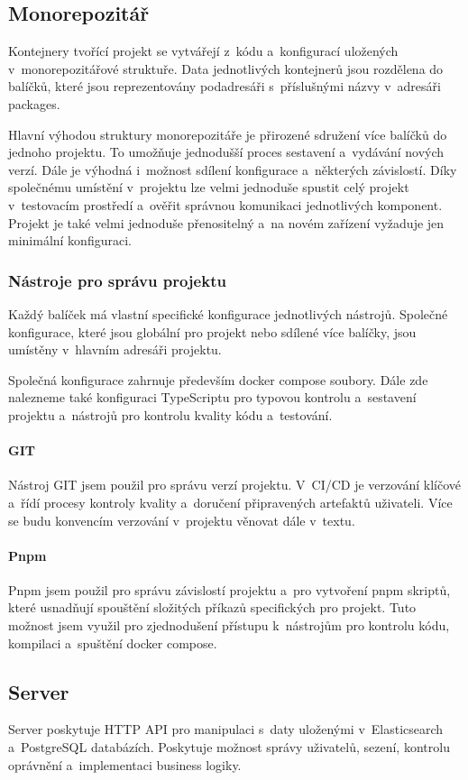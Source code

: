 \documentclass[
  tables=false,
  glossaries,
  index
]{kidiplom}
\begin{document}
\subsection{Monorepozitář}
Kontejnery tvořící projekt se vytvářejí z~kódu a~konfigurací uložených v~monorepozitářové struktuře. Data jednotlivých kontejnerů jsou rozdělena do balíčků, které jsou reprezentovány podadresáři s~příslušnými názvy v~adresáři packages.

Hlavní výhodou struktury monorepozitáře je přirozené sdružení více balíčků do jednoho projektu. To umožňuje jednodušší proces sestavení a~vydávání nových verzí. Dále je výhodná i~možnost sdílení konfigurace a~některých závislostí. Díky společnému umístění v~projektu lze velmi jednoduše spustit celý projekt v~testovacím prostředí a~ověřit správnou komunikaci jednotlivých komponent. Projekt je také velmi jednoduše přenositelný a~na novém zařízení vyžaduje jen minimální konfiguraci.

\subsubsection{Nástroje pro správu projektu}
Každý balíček má vlastní specifické konfigurace jednotlivých nástrojů. Společné konfigurace, které jsou globální pro projekt nebo sdílené více balíčky, jsou umístěny v~hlavním adresáři projektu.

Společná konfigurace zahrnuje především docker compose soubory. Dále zde nalezneme také  konfiguraci TypeScriptu pro typovou kontrolu a~sestavení projektu a~nástrojů pro kontrolu kvality kódu a~testování.

\paragraph{GIT}
Nástroj GIT jsem použil pro správu verzí projektu. V~CI/CD je verzování klíčové a~řídí procesy kontroly kvality a~doručení připravených artefaktů uživateli. Více se budu konvencím verzování v~projektu věnovat dále v~textu.
\paragraph{Pnpm}
Pnpm jsem použil pro správu závislostí projektu a~pro vytvoření pnpm skriptů, které usnadňují spouštění složitých příkazů specifických pro projekt. Tuto možnost jsem využil pro zjednodušení přístupu k~nástrojům pro kontrolu kódu, kompilaci a~spuštění docker compose.

\subsection{Server}
Server poskytuje HTTP API pro manipulaci s~daty uloženými v~Elasticsearch a~PostgreSQL databázích. Poskytuje možnost správy uživatelů, sezení, kontrolu oprávnění a~implementaci business logiky.
\end{document}
